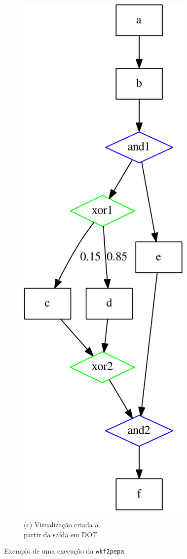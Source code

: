 \documentclass[a4paper,10pt]{article}
\begin{document}
\begin{figure}[h]
\begin{subfigure}[b]{0.6\textwidth}
        \end{subfigure}%
        ~~%
        \begin{subfigure}[b]{0.4\textwidth}
		        \centering
                \includegraphics[scale=0.55]{example-crop.pdf}

                (c) Visualização criada a \\ partir da saída em DOT
                \label{fig:tiger}
        \end{subfigure}
        \caption{Exemplo de uma execução da \texttt{wkf2pepa}.}
        \label{fig:exemplo}
\end{figure}\\
\end{document}
